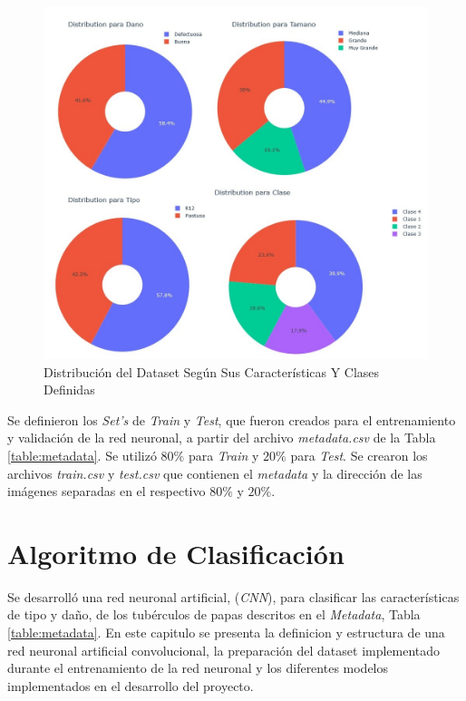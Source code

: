 	\begin{figure}[ht]
		\centering
		\includegraphics[scale=0.4]{Figs/Distribucion.jpg}
		\caption{Distribución del Dataset Según Sus Características Y Clases Definidas}
		\label{fig:distribuciontipo}
	\end{figure}

	Se definieron los \textit{Set's} de \textit{Train} y \textit{Test}, que fueron creados para el entrenamiento y validación de la red neuronal, a partir del archivo \textit{metadata.csv} de la Tabla \ref{table:metadata}. Se utilizó $80\%$ para \textit{Train} y $20\%$ para \textit{Test}. Se crearon los archivos \textit{train.csv} y \textit{test.csv} que contienen el \textit{metadata} y la dirección de las imágenes separadas en el respectivo $80\%$ y $20\%$.



\chapter{Algoritmo de Clasificación}

Se desarrolló una red neuronal artificial, (\textit{CNN}), para clasificar las características de tipo y daño, de los tubérculos de papas descritos en el \textit{Metadata}, Tabla \ref{table:metadata}. En este capitulo se presenta la definicion y estructura de una red neuronal artificial convolucional, la preparación del dataset implementado durante el entrenamiento de la red neuronal y los diferentes modelos implementados en el desarrollo del proyecto.


